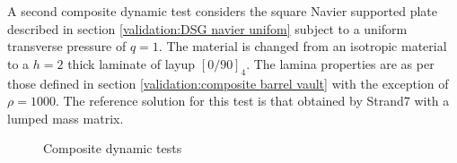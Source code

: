 A second composite dynamic test considers the square Navier supported plate described in section \ref{validation:DSG navier unifom} subject to a uniform transverse pressure of $q = 1$. The material is changed from an isotropic material to a $h = 2$ thick laminate of layup $[0/90]_4$. The lamina properties are as per those defined in section \ref{validation:composite barrel vault} with the exception of $\rho = 1000$. The reference solution for this test is that obtained by Strand7 with a lumped mass matrix.

\begin{figure}[H]
	\caption{\label{Composite dynamic benchmarks}Composite dynamic tests}
\end{figure}

